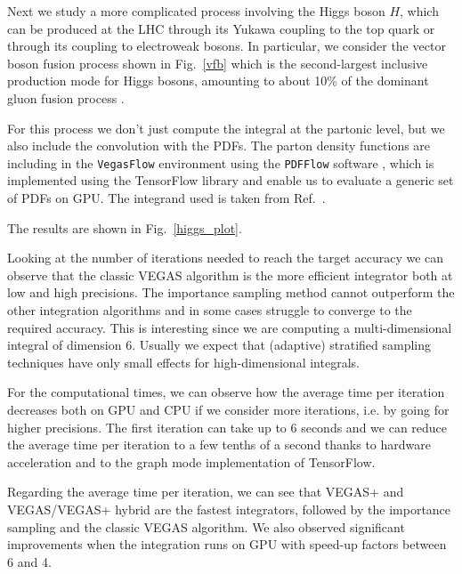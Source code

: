 \documentclass[../main/main.tex]{subfiles}
\begin{document}
Next we study a more complicated process involving the Higgs boson $H$, which can be produced at the LHC through its Yukawa coupling to the top quark or through its coupling to electroweak bosons. In particular, we consider the vector boson fusion process shown in Fig.~\ref{vfb} which is the second-largest inclusive production mode for Higgs bosons, amounting to about 10\% of the dominant gluon fusion process \cite{Cruz_Martinez_2018}.

For this process we don't just compute the integral at the partonic level, but we also include the convolution with the PDFs. 
The parton density functions are including in the \texttt{VegasFlow} environment using the \texttt{PDFFlow} software \cite{Carrazza_2021,juan_m_cruz_martinez_2021_4903010}, which is implemented using the TensorFlow library and enable us to evaluate a generic set of PDFs on GPU. 
The integrand used is taken from Ref.~\cite{juan_m_cruz_martinez_2021_4903010}.

The results are shown in Fig.~\ref{higgs_plot}.

Looking at the number of iterations needed to reach the target accuracy we can observe that the classic VEGAS algorithm is the more efficient integrator both at low and high precisions. The importance sampling method cannot outperform the other integration algorithms and in some cases struggle to converge to the required accuracy. This is interesting since we are computing a multi-dimensional integral of dimension 6. Usually we expect that (adaptive) stratified sampling techniques have only small effects for high-dimensional integrals.

For the computational times, we can observe how the average time per iteration decreases both on GPU and CPU if we consider more iterations, i.e. by going for higher precisions. The first iteration can take up to 6 seconds and we can reduce the average time per iteration to a few tenths of a second thanks to hardware acceleration and to the graph mode implementation of TensorFlow.

Regarding the average time per iteration, we can see that VEGAS+ and VEGAS/VEGAS+ hybrid are the fastest integrators, followed by the importance sampling and the classic VEGAS algorithm. We also observed significant improvements when the integration runs on GPU with speed-up factors between 6 and 4.

 
\end{document}
